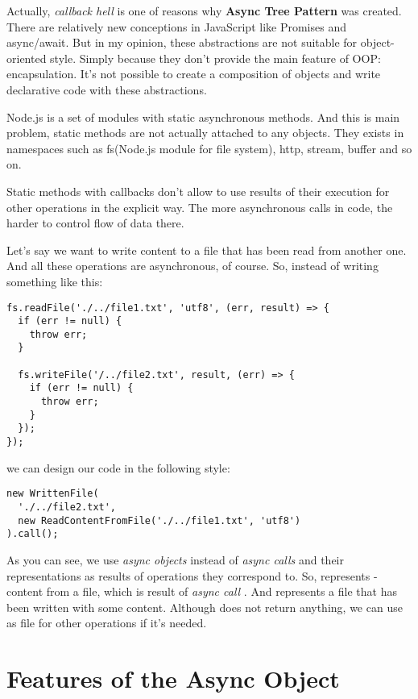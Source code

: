\documentclass{article}
\newcommand{\cit}[1]{{\fontfamily{qcr}\selectfont{\textit{\textbf{\textcolor{darkgray}{#1}}}}}}
\begin{document}
Actually, \textit{callback hell} is one of reasons why \textbf{Async Tree Pattern} was created. There are relatively new conceptions in JavaScript like Promises and async/await. But in my opinion, these abstractions are not suitable for object-oriented style. Simply because they don't provide the main feature of OOP: encapsulation. 
It's not possible to create a composition of objects and write declarative code with these abstractions.

Node.js is a set of modules with static asynchronous methods. And this is main problem, static methods are not actually attached to any objects. They exists in namespaces such as fs(Node.js module for file system), http, stream, buffer and so on.

Static methods with callbacks don't allow to use results of their execution for other operations in the explicit way. The more asynchronous calls in code, the harder to control flow of data there.

Let's say we want to write content to a file that has been read from another one. And all these operations are asynchronous, of course. So, instead of writing something like this:

\begin{lstlisting}
fs.readFile('./../file1.txt', 'utf8', (err, result) => {
  if (err != null) {
    throw err;
  }
 
  fs.writeFile('/../file2.txt', result, (err) => {
    if (err != null) {
      throw err;
    }
  });
});
\end{lstlisting}

we can design our code in the following style:

\begin{lstlisting}
new WrittenFile(
  './../file2.txt',
  new ReadContentFromFile('./../file1.txt', 'utf8')
).call();
\end{lstlisting}

As you can see, we use \textit{async objects} instead of \textit{async calls} and their representations as results of operations they correspond to. So, \cit{ReadContentFromFile} represents \cit{string} - content from a file, which is result of \textit{async call} \cit{fs.readFile}. And \cit{WrittenFile} represents a file that has been written with some content. Although \cit{fs.WriteFile} does not return anything, we can use \cit{WrittenFile} as file for other operations if it's needed.

\section{Features of the Async Object}
\end{document}
